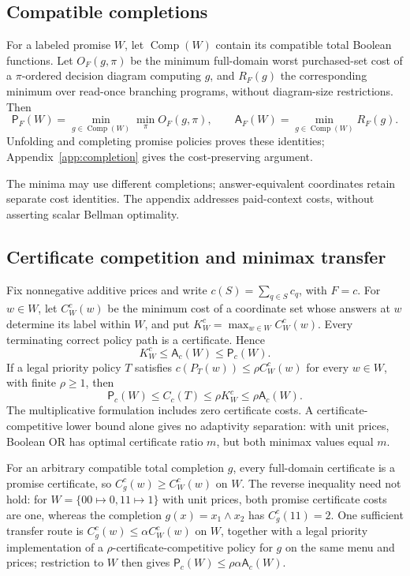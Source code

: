 \documentclass[pdflatex,sn-mathphys-num]{sn-jnl}
\newcommand{\A}{\mathsf{A}}
\newcommand{\Pcost}{\mathsf{P}}
\newcommand{\Comp}{\operatorname{Comp}}
\theoremstyle{thmstyleone}
\theoremstyle{thmstylethree}
\theoremstyle{thmstyletwo}
\begin{document}
\subsection{Compatible completions}\label{sec:completion}
For a labeled promise $W$, let $\Comp(W)$ contain its compatible total Boolean functions. Let $O_F(g,\pi)$ be the minimum full-domain worst purchased-set cost of a $\pi$-ordered decision diagram computing $g$, and $R_F(g)$ the corresponding minimum over read-once branching programs, without diagram-size restrictions. Then
\[
 \Pcost_F(W)=\min_{g\in\Comp(W)}\min_\pi O_F(g,\pi),\qquad
 \A_F(W)=\min_{g\in\Comp(W)}R_F(g).
\]
Unfolding and completing promise policies proves these identities; Appendix~\ref{app:completion} gives the cost-preserving argument.

The minima may use different completions; answer-equivalent coordinates retain separate cost identities. The appendix addresses paid-context costs, without asserting scalar Bellman optimality.

\subsection{Certificate competition and minimax transfer}\label{sec:cert-transfer}
Fix nonnegative additive prices and write $c(S)=\sum_{q\in S}c_q$, with $F=c$. For $w\in W$, let $C_W^c(w)$ be the minimum cost of a coordinate set whose answers at $w$ determine its label within $W$, and put $K_W^c=\max_{w\in W}C_W^c(w)$. Every terminating correct policy path is a certificate. Hence
\[
 K_W^c\leq\A_c(W)\leq\Pcost_c(W).
\]
If a legal priority policy $T$ satisfies $c(P_T(w))\leq\rho C_W^c(w)$ for every $w\in W$, with finite $\rho\geq1$, then
\[
 \Pcost_c(W)\leq C_c(T)\leq\rho K_W^c\leq\rho\A_c(W).
\]
The multiplicative formulation includes zero certificate costs. A certificate-competitive lower bound alone gives no adaptivity separation: with unit prices, Boolean OR has optimal certificate ratio $m$, but both minimax values equal $m$.

For an arbitrary compatible total completion $g$, every full-domain certificate is a promise certificate, so $C_g^c(w)\geq C_W^c(w)$ on $W$. The reverse inequality need not hold: for $W=\{00\mapsto0,11\mapsto1\}$ with unit prices, both promise certificate costs are one, whereas the completion $g(x)=x_1\wedge x_2$ has $C_g^c(11)=2$. One sufficient transfer route is $C_g^c(w)\leq\alpha C_W^c(w)$ on $W$, together with a legal priority implementation of a $\rho$-certificate-competitive policy for $g$ on the same menu and prices; restriction to $W$ then gives $\Pcost_c(W)\leq\rho\alpha\A_c(W)$.
\end{document}
